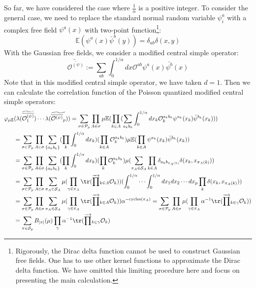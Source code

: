 \documentclass[a4paper,11pt]{article}
\theoremstyle{definition}
\numberwithin{equation}{section}
\begin{document}
So far, we have considered the case where $\frac{1}{\alpha}$ is a positive integer. To consider the general case, we need to replace the standard normal random variable $\psi^a_i$ with a complex free field $\psi^a(x)$ with two-point function\footnote{Rigorously, the Dirac delta function cannot be used to construct Gaussian free fields. One has to use other kernel functions to approximate the Dirac delta function. We have omitted this limiting procedure here and focus on presenting the main calculation.}:
\begin{equation}
    \mathbb{E}(\psi^a(x)\bar{\psi}^b(y)) = \delta_{ab}\delta(x,y)
\end{equation}
With the Gaussian free fields, we consider a modified central simple operator:
\begin{equation}
    \widetilde{\overline{\mathcal{O}^{(\psi)}}} := \sum_{ab}\int_0^{1/\alpha}dx \mathcal{O}^{ab}\psi^a(x)\bar{\psi^b}(x)
\end{equation}
Note that in this modified central simple operator, we have taken $d = 1$. Then we can calculate the correlation function of the Poisson quantized modified central simple operators:
\begin{align}
    \begin{split}
        \varphi_{\mu\mathbb{E}}&(\lambda(\widetilde{\overline{\mathcal{O}^{(\psi)}_1}})\cdots\lambda(\widetilde{\overline{\mathcal{O}^{(\psi)}}_p}))=\sum_{\sigma\in\mathcal{P}_p}\prod_{A\in\sigma}\mu\mathbb{E}(\prod_{k\in A}(\sum_{a_kb_k}\int_0^{1/\alpha}dx_k \mathcal{O}^{a_kb_k}_k\psi^{a_k}(x_k)\bar{\psi}^{b_k}(x_k)))
        \\
        &=\sum_{\sigma\in\mathcal{P}_p}\prod_{A\in\sigma}\sum_{\{a_kb_k\}}(\prod_k\int_0^{1/\alpha}dx_k)(\prod_{k\in A}\mathcal{O}^{a_kb_k}_k)\mu\mathbb{E}(\prod_{k\in A}\psi^{a_k}(x_k)\bar{\psi}^{b_k}(x_k))
        \\&=\sum_{\sigma\in\mathcal{P}_p}\prod_{A\in\sigma}\sum_{\{a_kb_k\}}(\prod_k\int_0^{1/\alpha}dx_k)(\prod_k \mathcal{O}^{a_kb_k}_k)\mu(\sum_{\pi_A\in\mathcal{S}_A}\prod_{k\in A}\delta_{a_kb_{\pi_A(k)}}\delta(x_k,x_{\pi_A(k)}))
        \\
        &=\sum_{\sigma\in\mathcal{P}_p}\prod_{A\in\sigma}\sum_{\pi_A\in\mathcal{S}_A}\mu(\prod_{\gamma\in\pi_A}\tr(\overrightarrow{\prod}_{k\in A}\mathcal{O}_k))(\int_0^{1/\alpha}\cdots\int_0^{1/\alpha}dx_1dx_2\cdots dx_p\prod_k\delta(x_k,x_{\pi_A(k)}))
        \\&=\sum_{\sigma\in\mathcal{P}_p}\prod_{A\in\sigma}\sum_{\pi_A\in\mathcal{S}_A}\mu(\prod_{\gamma\in\pi_A}\tr(\overrightarrow{\prod}_{k\in A}\mathcal{O}_k))\alpha^{-\text{cycles}(\pi_A)}
        =\sum_{\sigma\in\mathcal{P}_p}\prod_{A\in\sigma}\mu(\prod_{\gamma\in\pi_A}\alpha^{-1}\tr(\overrightarrow{\prod}_{k\in \gamma}\mathcal{O}_k))
        \\&=\sum_{\pi\in\mathcal{S}_p}B_{|\pi|}(\mu)\prod_\gamma\alpha^{-1}\tr(\overrightarrow{\prod}_{k\in \gamma}\mathcal{O}_k)
    \end{split}
\end{align}
\end{document}
